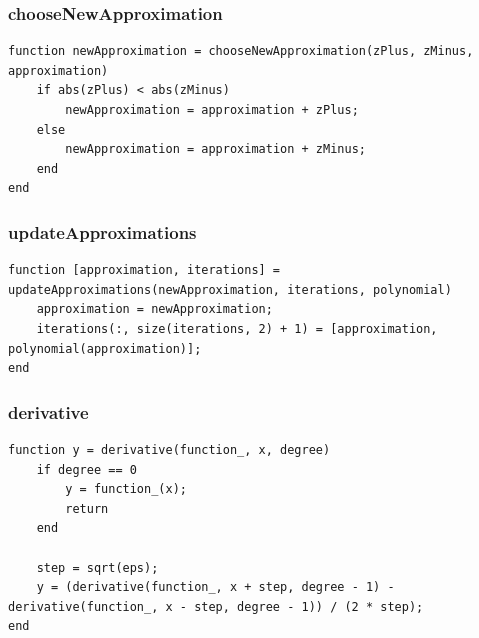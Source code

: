 \subsubsection{chooseNewApproximation}
\begin{simplechar}
\begin{lstlisting}
function newApproximation = chooseNewApproximation(zPlus, zMinus, approximation)
    if abs(zPlus) < abs(zMinus)
        newApproximation = approximation + zPlus;
    else
        newApproximation = approximation + zMinus;
    end
end
\end{lstlisting}
\end{simplechar}

\subsubsection{updateApproximations}
\begin{simplechar}
\begin{lstlisting}
function [approximation, iterations] = updateApproximations(newApproximation, iterations, polynomial)
    approximation = newApproximation;
    iterations(:, size(iterations, 2) + 1) = [approximation, polynomial(approximation)];
end
\end{lstlisting}
\end{simplechar}

\subsubsection{derivative}
\begin{simplechar}
\begin{lstlisting}
function y = derivative(function_, x, degree)
    if degree == 0
        y = function_(x);
        return
    end

    step = sqrt(eps);
    y = (derivative(function_, x + step, degree - 1) - derivative(function_, x - step, degree - 1)) / (2 * step);
end
\end{lstlisting}
\end{simplechar}

